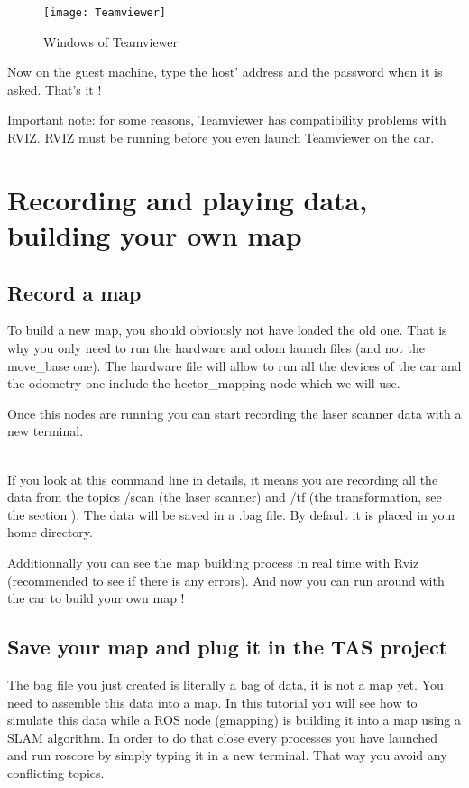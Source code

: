 \begin{figure}[htbp]
	\centering
		\texttt{[image: Teamviewer]}
	\caption{Windows of Teamviewer}
	\label{fig:advanced_tv}
\end{figure}

Now on the guest machine, type the host' address and the password when it is asked. That's it !

Important note: for some reasons, Teamviewer has compatibility problems with RVIZ. RVIZ must be running before you even launch Teamviewer on the car.


\section{Recording and playing data, building your own map}
\label{sec:advanced_rosbag}

\subsection{Record a map}

To build a new map, you should obviously not have loaded the old one. That is why you only need to run the hardware and odom launch files (and not the move\_base one). The hardware file will allow to run all the devices of the car and the odometry one include the hector\_mapping node which we will use.

Once this nodes are running you can start recording the laser scanner data with a new terminal.

 \\

If you look at this command line in details, it means you are recording all the data from the topics /scan (the laser scanner) and /tf (the transformation, see the section ). The data will be saved in a .bag file. By default it is placed in your home directory.

Additionnally you can see the map building process in real time with Rviz (recommended to see if there is any errors). And now you can run around with the car to build your own map !

\subsection{Save your map and plug it in the TAS project}

The bag file you just created is literally a bag of data, it is not a map yet. You need to assemble this data into a map. In this tutorial you will see how to simulate this data while a ROS node (gmapping) is building it into a map using a SLAM algorithm. In order to do that close every processes you have launched and run roscore by simply typing it in a new terminal. That way you avoid any conflicting topics.

